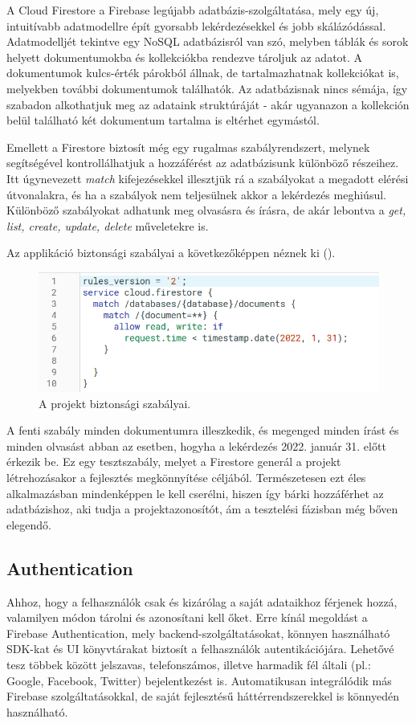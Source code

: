 A Cloud Firestore a Firebase legújabb adatbázis-szolgáltatása, mely egy új, intuitívabb adatmodellre épít gyorsabb lekérdezésekkel és jobb skálázódással. \cite{RealtimevsFirestore} Adatmodelljét tekintve egy NoSQL adatbázisról van szó, melyben táblák és sorok helyett dokumentumokba és kollekciókba rendezve tároljuk az adatot. A dokumentumok kulcs-érték párokból állnak, de tartalmazhatnak kollekciókat is, melyekben további dokumentumok találhatók. \cite{FirestoreDataModel} Az adatbázisnak nincs sémája, így szabadon alkothatjuk meg az adataink struktúráját - akár ugyanazon a kollekción belül található két dokumentum tartalma is eltérhet egymástól.

Emellett a Firestore biztosít még egy rugalmas szabályrendszert, melynek segítségével kontrollálhatjuk a hozzáférést az adatbázisunk különböző részeihez. Itt úgynevezett \emph{match} kifejezésekkel illesztjük rá a szabályokat a megadott elérési útvonalakra, és ha a szabályok nem teljesülnek akkor a lekérdezés meghiúsul. Különböző szabályokat adhatunk meg olvasásra és írásra, de akár lebontva a \emph{get, list, create, update, delete} műveletekre is.

Az applikáció biztonsági szabályai a következőképpen néznek ki ().

\begin{figure}[!ht]
	\centering
	\includegraphics[width=120mm, keepaspectratio]{figures/rules.png}
	\caption{A projekt biztonsági szabályai.}
	\label{fig:FirestoreRules}
\end{figure}

A fenti szabály minden dokumentumra illeszkedik, és megenged minden írást és minden olvasást abban az esetben, hogyha a lekérdezés 2022. január 31. előtt érkezik be. Ez egy tesztszabály, melyet a Firestore generál a projekt létrehozásakor a fejlesztés megkönnyítése céljából. Természetesen ezt éles alkalmazásban mindenképpen le kell cserélni, hiszen így bárki hozzáférhet az adatbázishoz, aki tudja a projektazonosítót, ám a tesztelési fázisban még bőven elegendő.

\subsection{Authentication}
Ahhoz, hogy a felhasználók csak és kizárólag a saját adataikhoz férjenek hozzá, valamilyen módon tárolni és azonosítani kell őket. Erre kínál megoldást a Firebase Authentication, mely backend-szolgáltatásokat, könnyen használható SDK-kat és UI könyvtárakat biztosít a felhasználók autentikációjára. Lehetővé tesz többek között jelszavas, telefonszámos, illetve harmadik fél általi (pl.: Google, Facebook, Twitter) bejelentkezést is. Automatikusan integrálódik más Firebase szolgáltatásokkal, de saját fejlesztésű háttérrendszerekkel is könnyedén használható.  \cite{Auth}

